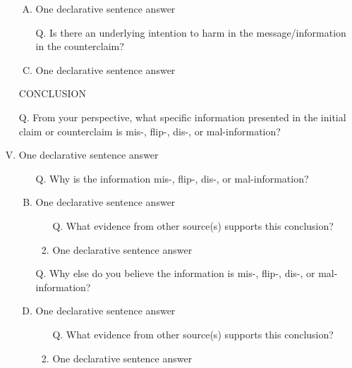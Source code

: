 \documentclass[a4paper, 12pt]{article}
\begin{document}
\begin{CJK*}{UTF8}{bsmi}
\begin{enumerate}[I.]
\begin{enumerate}[A.]
                  \item {\color{gray} One declarative sentence answer}
                  \item [Q.] Is there an underlying intention to harm in the message/information in the {\color{red}counterclaim}?
                  \item {\color{gray} One declarative sentence answer}
              \end{enumerate}
        \item [] %
        \item [] CONCLUSION
        \item [Q.] From your perspective, what specific information presented in the {\color{blue}initial claim} or {\color{red}counterclaim}
              is {\color{blue} mis}-, {\color{blue}flip}-, {\color{blue}dis}-, or {\color{blue}mal}-information?
        \item {\color{gray} One declarative sentence answer} %
              \begin{enumerate}[A.]
                  \item [Q.] Why is the information {\color{blue} mis}-, {\color{blue}flip}-, {\color{blue}dis}-, or {\color{blue}mal}-information?
                  \item {\color{gray} One declarative sentence answer} %
                        \begin{enumerate}[1.]
                            \item [Q.] What evidence from other source(s) supports this conclusion?
                            \item {\color{gray} One declarative sentence answer} %
                        \end{enumerate}
                  \item [Q.] Why else do you believe the information is {\color{blue} mis}-, {\color{blue}flip}-, {\color{blue}dis}-, or {\color{blue}mal}-information?
                  \item {\color{gray} One declarative sentence answer} %
                        \begin{enumerate}[1.]
                            \item [Q.] What evidence from other source(s) supports this conclusion?
                            \item {\color{gray} One declarative sentence answer} %
                        \end{enumerate}
              \end{enumerate}
    \end{enumerate}

    \printbibliography[title=REFERENCES]

\end{CJK*}
\end{document}
